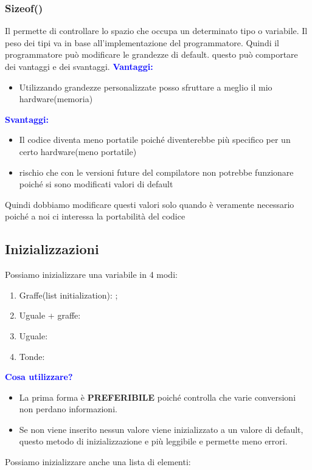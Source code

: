 \subsubsection{Sizeof()}
Il  permette di controllare lo spazio che occupa un determinato tipo o variabile. Il peso dei tipi va in base all'implementazione del programmatore. Quindi il programmatore può modificare le grandezze di default.
questo può comportare dei vantaggi e dei svantaggi.\newline\newline
 \textbf{\textcolor{blue}{Vantaggi:}}
\begin{itemize}
    \item Utilizzando grandezze personalizzate posso sfruttare a meglio il mio hardware(memoria)\newline
\end{itemize}
\textbf{\textcolor{blue}{Svantaggi:}}
\begin{itemize}
    \item Il codice diventa meno portatile poiché diventerebbe più specifico per un certo hardware(meno portatile)
    \item rischio che con le versioni future del compilatore non potrebbe funzionare poiché si sono modificati valori di default
\end{itemize}

Quindi dobbiamo modificare questi valori solo quando è veramente necessario poiché a noi ci interessa la portabilità del codice

\subsection{Inizializzazioni}
\hypertarget{init}{}
Possiamo inizializzare una variabile in 4 modi:

\begin{enumerate}
    \item Graffe(list initialization): ;
    \item Uguale + graffe: 
    \item Uguale: 
    \item Tonde:  
\end{enumerate}
\textbf{\textcolor{blue}{Cosa utilizzare?}}
\begin{itemize}
    \item La prima forma è \textbf{PREFERIBILE} poiché controlla che varie conversioni non perdano informazioni.
    \item Se non viene inserito nessun valore viene inizializzato a un valore di default, questo metodo di inizializzazione e più leggibile e permette meno errori.
    
\end{itemize}
Possiamo inizializzare anche una lista di elementi:


